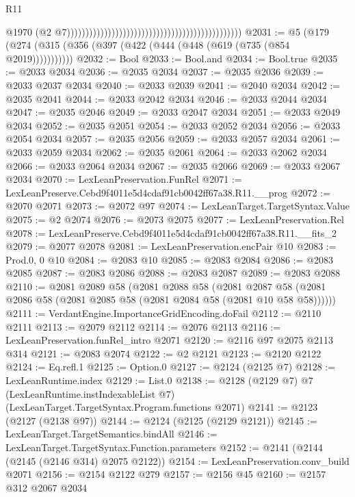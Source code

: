 \begin{lexlean}{R11}
\begin{coremodule}
                                                                                                @1970
                                                                                                (@2
                                                                                                  @7)))))))))))))))))))))))))))))))))))))))))))))))
@2031 := @5 (@179 (@274 (@315 (@356 (@397 (@422 (@444 (@448 (@619 (@735 (@854 @2019)))))))))))
@2032 := Bool
@2033 := Bool.and
@2034 := Bool.true
@2035 := @2033 @2034
@2036 := @2035 @2034
@2037 := @2035 @2036
@2039 := @2033 @2037 @2034
@2040 := @2033 @2039
@2041 := @2040 @2034
@2042 := @2035 @2041
@2044 := @2033 @2042 @2034
@2046 := @2033 @2044 @2034
@2047 := @2035 @2046
@2049 := @2033 @2047 @2034
@2051 := @2033 @2049 @2034
@2052 := @2035 @2051
@2054 := @2033 @2052 @2034
@2056 := @2033 @2054 @2034
@2057 := @2035 @2056
@2059 := @2033 @2057 @2034
@2061 := @2033 @2059 @2034
@2062 := @2035 @2061
@2064 := @2033 @2062 @2034
@2066 := @2033 @2064 @2034
@2067 := @2035 @2066
@2069 := @2033 @2067 @2034
@2070 := LexLeanPreservation.FunRel
@2071 := LexLeanPreserve.Cebd9f4011e5d4cdaf91cb0042ff67a38.R11.__prog
@2072 := @2070 @2071
@2073 := @2072 @97
@2074 := LexLeanTarget.TargetSyntax.Value
@2075 := @2 @2074
@2076 := @2073 @2075
@2077 := LexLeanPreservation.Rel
@2078 := LexLeanPreserve.Cebd9f4011e5d4cdaf91cb0042ff67a38.R11.__fits_2
@2079 := @2077 @2078
@2081 := LexLeanPreservation.encPair @10
@2083 := Prod.{0, 0} @10
@2084 := @2083 @10
@2085 := @2083 @2084
@2086 := @2083 @2085
@2087 := @2083 @2086
@2088 := @2083 @2087
@2089 := @2083 @2088
@2110 := @2081
    @2089
    @58
    (@2081
      @2088
      @58
      (@2081 @2087 @58 (@2081 @2086 @58 (@2081 @2085 @58 (@2081 @2084 @58 (@2081 @10 @58 @58))))))
@2111 := VerdantEngine.ImportanceGridEncoding.doFail
@2112 := @2110 @2111
@2113 := @2079 @2112
@2114 := @2076 @2113
@2116 := LexLeanPreservation.funRel_intro @2071
@2120 := @2116 @97 @2075 @2113 @314
@2121 := @2083 @2074
@2122 := @2 @2121
@2123 := @2120 @2122
@2124 := Eq.refl.{1}
@2125 := Option.{0}
@2127 := @2124 (@2125 @7)
@2128 := LexLeanRuntime.index
@2129 := List.{0}
@2138 := @2128
    (@2129 @7)
    @7
    (LexLeanRuntime.instIndexableList @7)
    (LexLeanTarget.TargetSyntax.Program.functions @2071)
@2141 := @2123 (@2127 (@2138 @97))
@2144 := @2124 (@2125 (@2129 @2121))
@2145 := LexLeanTarget.TargetSemantics.bindAll
@2146 := LexLeanTarget.TargetSyntax.Function.parameters
@2152 := @2141 (@2144 (@2145 (@2146 @314) @2075 @2122))
@2154 := LexLeanPreservation.conv_build @2071
@2156 := @2154 @2122 @279
@2157 := @2156 @45
@2160 := @2157 @312 @2067 @2034

\end{coremodule}
\end{lexlean}
